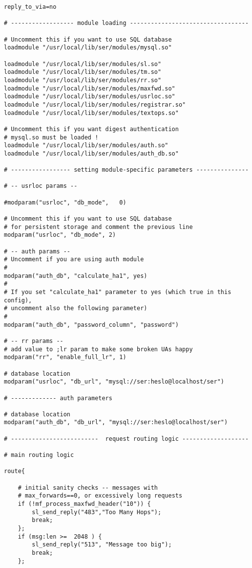 \documentclass[a4paper,12pt]{report}
\newenvironment{myscriptlisting}
{\begin{list}{}{\setlength{\leftmargin}{1em}}\item\scriptsize\bfseries}
{\end{list}}
\begin{document}
\begin{myscriptlisting}
\begin{verbatim}
reply_to_via=no

# ------------------ module loading ----------------------------------

# Uncomment this if you want to use SQL database
loadmodule "/usr/local/lib/ser/modules/mysql.so"

loadmodule "/usr/local/lib/ser/modules/sl.so"
loadmodule "/usr/local/lib/ser/modules/tm.so"
loadmodule "/usr/local/lib/ser/modules/rr.so"
loadmodule "/usr/local/lib/ser/modules/maxfwd.so"
loadmodule "/usr/local/lib/ser/modules/usrloc.so"
loadmodule "/usr/local/lib/ser/modules/registrar.so"
loadmodule "/usr/local/lib/ser/modules/textops.so"

# Uncomment this if you want digest authentication
# mysql.so must be loaded !
loadmodule "/usr/local/lib/ser/modules/auth.so"
loadmodule "/usr/local/lib/ser/modules/auth_db.so"

# ----------------- setting module-specific parameters ---------------

# -- usrloc params --

#modparam("usrloc", "db_mode",   0)

# Uncomment this if you want to use SQL database 
# for persistent storage and comment the previous line
modparam("usrloc", "db_mode", 2)

# -- auth params --
# Uncomment if you are using auth module
#
modparam("auth_db", "calculate_ha1", yes)
#
# If you set "calculate_ha1" parameter to yes (which true in this
config), 
# uncomment also the following parameter)
#
modparam("auth_db", "password_column", "password")

# -- rr params --
# add value to ;lr param to make some broken UAs happy
modparam("rr", "enable_full_lr", 1)

# database location
modparam("usrloc", "db_url", "mysql://ser:heslo@localhost/ser")

# ------------- auth parameters

# database location
modparam("auth_db", "db_url", "mysql://ser:heslo@localhost/ser")

# -------------------------  request routing logic -------------------

# main routing logic

route{

	# initial sanity checks -- messages with
	# max_forwards==0, or excessively long requests
	if (!mf_process_maxfwd_header("10")) {
		sl_send_reply("483","Too Many Hops");
		break;
	};
	if (msg:len >=  2048 ) {
		sl_send_reply("513", "Message too big");
		break;
	};
	


\end{verbatim}
\end{myscriptlisting}
\end{document}
